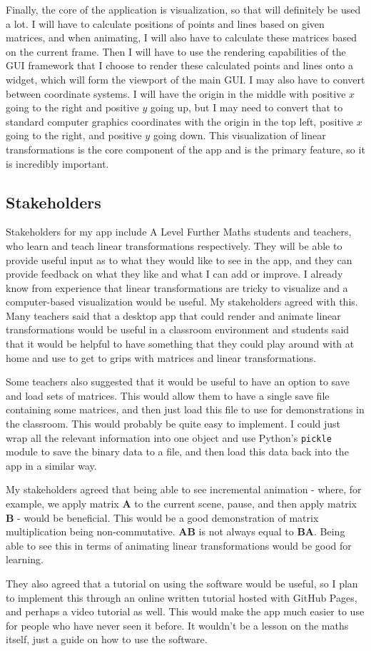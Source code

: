 \documentclass[../main.tex]{subfiles}
\begin{document}
Finally, the core of the application is visualization, so that will definitely be used a lot. I will have to calculate positions of points and lines based on given matrices, and when animating, I will also have to calculate these matrices based on the current frame. Then I will have to use the rendering capabilities of the GUI framework that I choose to render these calculated points and lines onto a widget, which will form the viewport of the main GUI. I may also have to convert between coordinate systems. I will have the origin in the middle with positive $x$ going to the right and positive $y$ going up, but I may need to convert that to standard computer graphics coordinates with the origin in the top left, positive $x$ going to the right, and positive $y$ going down. This visualization of linear transformations is the core component of the app and is the primary feature, so it is incredibly important.

\subsection{Stakeholders}

Stakeholders for my app include A Level Further Maths students and teachers, who learn and teach linear transformations respectively. They will be able to provide useful input as to what they would like to see in the app, and they can provide feedback on what they like and what I can add or improve. I already know from experience that linear transformations are tricky to visualize and a computer-based visualization would be useful. My stakeholders agreed with this. Many teachers said that a desktop app that could render and animate linear transformations would be useful in a classroom environment and students said that it would be helpful to have something that they could play around with at home and use to get to grips with matrices and linear transformations.

Some teachers also suggested that it would be useful to have an option to save and load sets of matrices. This would allow them to have a single save file containing some matrices, and then just load this file to use for demonstrations in the classroom. This would probably be quite easy to implement. I could just wrap all the relevant information into one object and use Python's \texttt{pickle} module to save the binary data to a file, and then load this data back into the app in a similar way.

My stakeholders agreed that being able to see incremental animation - where, for example, we apply matrix $\mathbf{A}$ to the current scene, pause, and then apply matrix $\mathbf{B}$ - would be beneficial. This would be a good demonstration of matrix multiplication being non-commutative. $\mathbf{AB}$ is not always equal to $\mathbf{BA}$. Being able to see this in terms of animating linear transformations would be good for learning.

They also agreed that a tutorial on using the software would be useful, so I plan to implement this through an online written tutorial hosted with GitHub Pages, and perhaps a video tutorial as well. This would make the app much easier to use for people who have never seen it before. It wouldn't be a lesson on the maths itself, just a guide on how to use the software.
\end{document}
